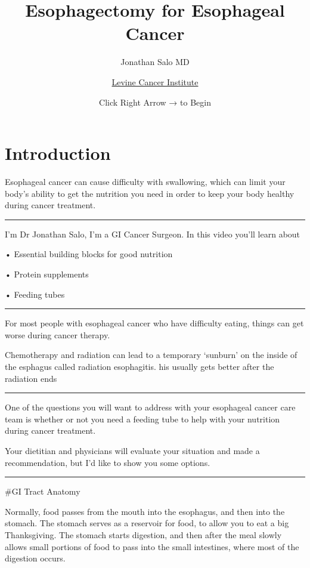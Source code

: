 \documentclass[
]{article}
\title{Esophagectomy for Esophageal Cancer}
\subtitle{Jonathan Salo MD}
\author{\href{https://atriumhealth.org/medical-services/specialty-care/cancer-care/esophageal-cancer/meet-the-team\#}{Levine
Cancer Institute}}
\date{Click Right Arrow → to Begin}
\begin{document}
\maketitle

{
\setcounter{tocdepth}{2}
\tableofcontents
}
\hypertarget{introduction}{%
\section{Introduction}\label{introduction}}

Esophageal cancer can cause difficulty with swallowing, which can limit
your body's ability to get the nutrition you need in order to keep your
body healthy during cancer treatment.

\begin{center}\rule{0.5\linewidth}{0.5pt}\end{center}

I'm Dr Jonathan Salo, I'm a GI Cancer Surgeon. In this video you'll
learn about

• Essential building blocks for good nutrition

• Protein supplements

• Feeding tubes

\begin{center}\rule{0.5\linewidth}{0.5pt}\end{center}

For most people with esophageal cancer who have difficulty eating,
things can get worse during cancer therapy.

Chemotherapy and radiation can lead to a temporary `sunburn' on the
inside of the esphagus called radiation esophagitis. his usually gets
better after the radiation ends

\begin{center}\rule{0.5\linewidth}{0.5pt}\end{center}

One of the questions you will want to address with your esophageal
cancer care team is whether or not you need a feeding tube to help with
your nutrition during cancer treatment.

Your dietitian and physicians will evaluate your situation and made a
recommendation, but I'd like to show you some options.

\begin{center}\rule{0.5\linewidth}{0.5pt}\end{center}

\#GI Tract Anatomy

Normally, food passes from the mouth into the esophagus, and then into
the stomach. The stomach serves as a reservoir for food, to allow you to
eat a big Thanksgiving. The stomach starts digestion, and then after the
meal slowly allows small portions of food to pass into the small
intestines, where most of the digestion occurs.
\end{document}
